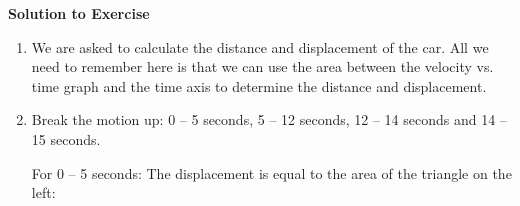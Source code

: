 {\begin{mdframed}[linewidth=4, leftmargin=40, rightmargin=40]
\begin{exercise}
      \vspace{5pt}
      \label{m38795*solfhsst!!!underscore!!!id3496}\noindent\textbf{Solution to Exercise } \label{m38795*listfhsst!!!underscore!!!id3496}\begin{enumerate}[noitemsep, label=\textbf{Step} \textbf{\arabic*}. ] 
            \leftskip=20pt\rightskip=\leftskip\item  
      \label{m38795*id73676}We are asked to calculate the distance and displacement of the car. All we need to remember here is that we can use the area between the velocity vs. time graph and the time axis to determine the distance and displacement.\par 
      \item  
      \label{m38795*id73688}Break the motion up: 0 -- 5 seconds, 5 -- 12 seconds, 12 -- 14 seconds and 14 -- 15 seconds.\par 
      \label{m38795*id73693}For 0 -- 5 seconds: The displacement is equal to the area of the triangle on the left:
\label{m38795*id73704}\nopagebreak\noindent{}
\end{enumerate}
\end{exercise}
\end{mdframed}}
